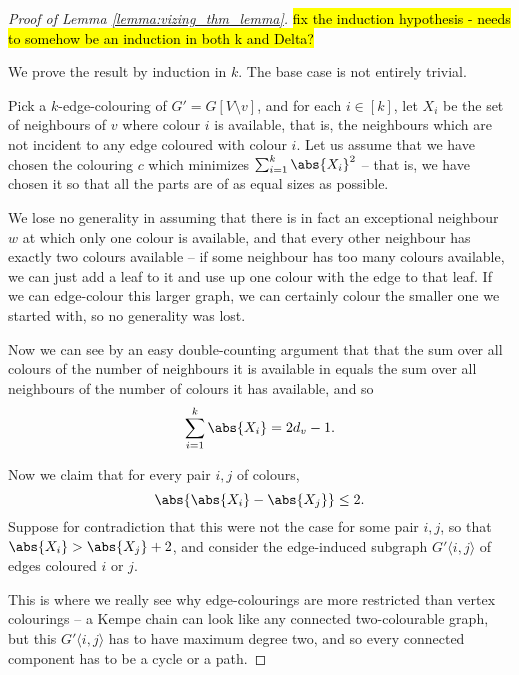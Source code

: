 \documentclass[nobib]{tufte-handout}
\begin{document}
\begin{proof}[Proof of Lemma \ref{lemma:vizing_thm_lemma}]
  \hl{fix the induction hypothesis - needs to somehow be an induction in both k and Delta?}

  We prove the result by induction in $k$. The base case is not entirely trivial.

  Pick a $k$-edge-colouring of $G' = G[V \setminus v]$, and for each $i \in [k]$, let $X_i$ be the set of neighbours of $v$ where colour $i$ is available, that is, the neighbours which are not incident to any edge coloured with colour $i$. Let us assume that we have chosen the colouring $c$ which minimizes $\sum_{i=1}^k \abs{X_i}^2$ -- that is, we have chosen it so that all the parts are of as equal sizes as possible.

  We lose no generality in assuming that there is in fact an exceptional neighbour $w$ at which only one colour is available, and that every other neighbour has exactly two colours available -- if some neighbour has too many colours available, we can just add a leaf to it and use up one colour with the edge to that leaf. If we can edge-colour this larger graph, we can certainly colour the smaller one we started with, so no generality was lost.

  Now we can see by an easy double-counting argument that that the sum over all colours of the number of neighbours it is available in equals the sum over all neighbours of the number of colours it has available, and so
  $$\sum_{i=1}^{k} \abs{X_i} = 2d_v - 1.$$

  Now we claim that for every pair $i, j$ of colours,
  $$\abs{\abs{X_i} - \abs{X_j}} \leq 2.$$
  Suppose for contradiction that this were not the case for some pair $i, j$, so that $\abs{X_i} > \abs{X_j} + 2$, and consider the edge-induced subgraph $G'\langle i, j\rangle$ of edges coloured $i$ or $j$.

  This is where we really see why edge-colourings are more restricted than vertex colourings -- a Kempe chain can look like any connected two-colourable graph, but this $G'\langle i, j\rangle$ has to have maximum degree two, and so every connected component has to be a cycle or a path. 
  

\end{proof}
\end{document}
